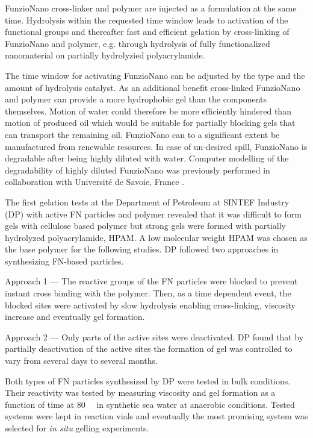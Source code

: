 \documentclass[journal = enfuem, manuscript =  article]{achemso}
\begin{document}
FunzioNano cross-linker and polymer are injected as a formulation at the same time. Hydrolysis within the requested time window leads to activation of the functional groups and thereafter fast and efficient gelation by cross-linking of FunzioNano and polymer, e.g. through hydrolysis of fully functionalized nanomaterial on partially hydrolyzied polyacrylamide. 

The time window for activating FunzioNano can be adjusted by the type and the amount of hydrolysis catalyst. As an additional benefit cross-linked FunzioNano and polymer can provide a more hydrophobic gel than the components themselves. Motion of water could therefore be more efficiently hindered than motion of produced oil which would be suitable for partially blocking gels that can transport the remaining oil. FunzioNano can to a significant extent be manufactured from renewable resources. In case of un-desired spill, FunzioNano is degradable after being highly diluted with water. Computer modelling of the degradability of highly diluted FunzioNano was previously performed in collaboration with Université de Savoie, France \citep{Neyertz2012,Neyertz2013}.

The first gelation tests at the Department of Petroleum at SINTEF Industry (DP) with active FN particles and polymer revealed that it was difficult to form gels with cellulose based polymer but strong gels were formed with partially hydrolyzed polyacrylamide, HPAM. A low molecular weight HPAM was chosen as the base polymer for the following studies. DP followed two approaches in synthesizing FN-based particles. 
    
    Approach 1 --- The reactive groups of the FN particles were blocked to prevent instant cross binding with the polymer. Then, as a time dependent event, the blocked sites were activated by slow hydrolysis enabling cross-linking, viscosity increase and eventually gel formation.
    
    Approach 2 --- Only parts of the active sites were deactivated. DP found that by partially deactivation of the active sites the formation of gel was controlled to vary from several days to several months.
    
Both types of FN particles synthesized by DP were tested in bulk conditions. Their reactivity was tested by measuring viscosity and gel formation as a function of time at 80~\celsius~ in synthetic sea water at anaerobic conditions. Tested systems were kept in reaction vials and eventually the most promising system  was selected for \emph{in situ} gelling experiments.
    
\end{document}
